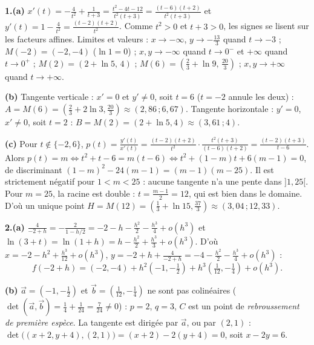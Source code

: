 \documentclass[a4paper,11pt]{article}
\numberwithin{equation}{section}
\numberwithin{figure}{section}
\numberwithin{table}{section}
\theoremstyle{enonce}
\theoremstyle{exemple}
\theoremstyle{remarque}
\newcommand{\ve}[1]{\vec{#1}}
\begin{document}
\textbf{1.(a)} $x'(t)=-\frac4{t^2}+\frac1{t+3}=\frac{t^2-4t-12}{t^2(t+3)}=\frac{(t-6)(t+2)}{t^2(t+3)}$ et
$y'(t)=1-\frac4{t^2}=\frac{(t-2)(t+2)}{t^2}$. Comme $t^2>0$ et $t+3>0$, les signes se lisent sur les facteurs affines. Limites et
valeurs : $x\to-\infty$, $y\to-\frac{13}3$ quand $t\to-3$ ; $M(-2)=(-2,-4)$ ($\ln1=0$) ; $x,y\to-\infty$ quand $t\to0^-$ et
$+\infty$ quand $t\to0^+$ ; $M(2)=(2+\ln5,\,4)$ ; $M(6)=\left(\frac23+\ln9,\,\frac{20}3\right)$ ; $x,y\to+\infty$ quand $t\to+\infty$.
\begin{center}
\end{center}

\textbf{(b)} Tangente verticale : $x'=0$ et $y'\neq0$, soit $t=6$ ($t=-2$ annule les deux) :
$A=M(6)=\left(\frac23+2\ln3,\frac{20}3\right)\approx(2{,}86\,;6{,}67)$. Tangente horizontale : $y'=0$, $x'\neq0$, soit $t=2$ :
$B=M(2)=(2+\ln5,4)\approx(3{,}61\,;4)$.

\textbf{(c)} Pour $t\notin\{-2,6\}$, $p(t)=\frac{y'(t)}{x'(t)}=\frac{(t-2)(t+2)}{t^2}\cdot\frac{t^2(t+3)}{(t-6)(t+2)}=\frac{(t-2)(t+3)}{t-6}$.
Alors $p(t)=m\iff t^2+t-6=m(t-6)\iff t^2+(1-m)t+6(m-1)=0$, de discriminant
$(1-m)^2-24(m-1)=(m-1)(m-25)$. Il est strictement négatif pour $1<m<25$ : aucune tangente n'a une pente dans $]1,25[$. Pour
$m=25$, la racine est double : $t=\frac{m-1}2=12$, qui est bien dans le domaine. D'où un unique point
$H=M(12)=\left(\frac13+\ln15,\frac{37}3\right)\approx(3{,}04\,;12{,}33)$.

\textbf{2.(a)} $\frac4{-2+h}=-\frac2{1-h/2}=-2-h-\frac{h^2}2-\frac{h^3}4+o(h^3)$ et $\ln(3+t)=\ln(1+h)=h-\frac{h^2}2+\frac{h^3}3+o(h^3)$.
D'où $x=-2-h^2+\frac{h^3}{12}+o(h^3)$, $y=-2+h+\frac4{-2+h}=-4-\frac{h^2}2-\frac{h^3}4+o(h^3)$ :
\[f(-2+h)=(-2,-4)+h^2\left(-1,-\tfrac12\right)+h^3\left(\tfrac1{12},-\tfrac14\right)+o(h^3).\]

\textbf{(b)} $\ve a=\left(-1,-\frac12\right)$ et $\ve b=\left(\frac1{12},-\frac14\right)$ ne sont pas colinéaires
($\det(\ve a,\ve b)=\frac14+\frac1{24}=\frac7{24}\neq0$) : $p=2$, $q=3$, $C$ est un point de \emph{rebroussement de première
espèce}. La tangente est dirigée par $\ve a$, ou par $(2,1)$ : $\det\big((x+2,y+4),(2,1)\big)=(x+2)-2(y+4)=0$, soit $x-2y=6$.
\end{document}
